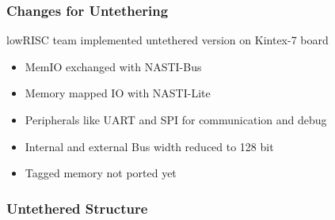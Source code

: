 \documentclass{beamer}
\begin{document}
\begin{frame}
	\frametitle{Changes for Untethering}
	lowRISC team implemented untethered version on Kintex-7 board
	\begin{itemize}
	\item MemIO exchanged with NASTI-Bus %
	\item Memory mapped IO with NASTI-Lite
	\item Peripherals like UART and SPI for communication and debug
	\item Internal and external Bus width reduced to 128 bit %
	\item Tagged memory not ported yet
	\end{itemize}
\end{frame}

\begin{frame}
	\frametitle{Untethered Structure}
	\begin{figure}[!h]
	\begin{center}
	\end{center}
	\end{figure}
\end{frame}
\end{document}
